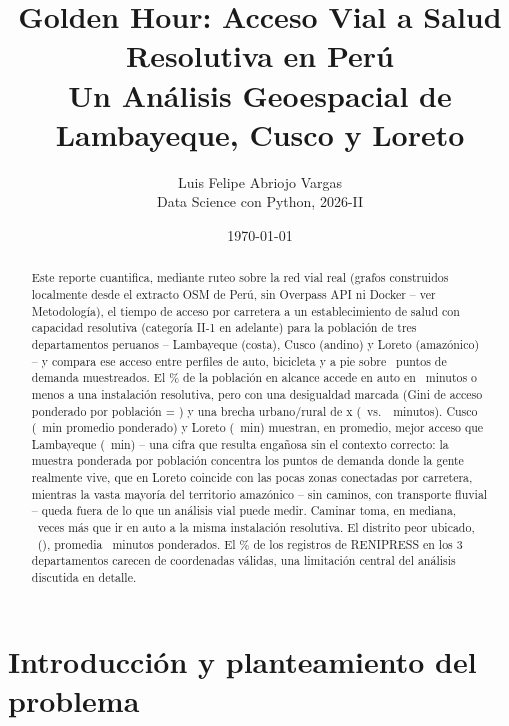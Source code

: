 \documentclass[11pt]{article}
\title{Golden Hour: Acceso Vial a Salud Resolutiva en Perú \\
\large Un Análisis Geoespacial de Lambayeque, Cusco y Loreto}
\author{Luis Felipe Abriojo Vargas \\ Data Science con Python, 2026-II}
\date{\today}
\begin{document}

\maketitle

\begin{abstract}
Este reporte cuantifica, mediante ruteo sobre la red vial real (grafos
construidos localmente desde el extracto OSM de Perú, sin Overpass API ni
Docker -- ver Metodología), el tiempo de acceso por carretera a un
establecimiento de salud con capacidad resolutiva (categoría II-1 en
adelante) para la población de tres departamentos peruanos -- Lambayeque
(costa), Cusco (andino) y Loreto (amazónico) -- y compara ese acceso entre
perfiles de auto, bicicleta y a pie sobre \statNSampled\ puntos de demanda
muestreados. El \statPctUnderFirstBand\% de la población en alcance accede
en auto en \statFirstBandMinutes\ minutos o menos a una instalación
resolutiva, pero con una desigualdad marcada (Gini de acceso ponderado por
población = \statGini) y una brecha urbano/rural de \statUrbanRuralRatio x
(\statUrbanMean\ vs.\ \statRuralMean\ minutos). Cusco (\statMeanAccessCusco\
min promedio ponderado) y Loreto (\statMeanAccessLoreto\ min) muestran, en
promedio, mejor acceso que Lambayeque (\statMeanAccessLambayeque\ min) --
una cifra que resulta engañosa sin el contexto
correcto: la muestra ponderada por población concentra los puntos de
demanda donde la gente realmente vive, que en Loreto coincide con las
pocas zonas conectadas por carretera, mientras la vasta mayoría del
territorio amazónico -- sin caminos, con transporte fluvial -- queda fuera
de lo que un análisis vial puede medir. Caminar toma, en mediana,
\statWalkCarRatio\ veces más que ir en auto a la misma instalación
resolutiva. El distrito peor ubicado, \statWorstDistrictName\
(\statWorstDistrictDept), promedia \statWorstDistrictMean\ minutos
ponderados. El \statPctMissingCoords\% de los registros de RENIPRESS en
los 3 departamentos carecen de coordenadas válidas, una limitación central
del análisis discutida en detalle.
\end{abstract}

\tableofcontents

\section{Introducción y planteamiento del problema}
\end{document}
